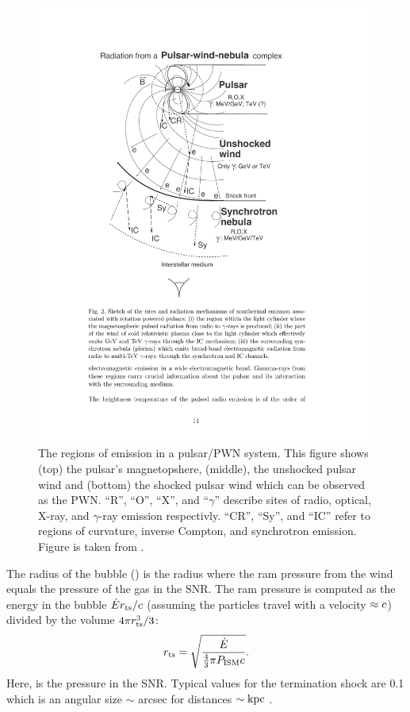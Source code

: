 \begin{figure}[htpb]
  \begin{center}
    \includegraphics{chapters/pulsar_pwn_system/figures/termination_shock.pdf}
  \end{center}
  \caption{The regions of emission in a pulsar/\ac{PWN} system. 
  This figure shows (top) the pulsar's magnetopshere, (middle), the
  unshocked pulsar wind and (bottom) the shocked pulsar wind which can
  be observed as the \ac{PWN}.
  ``R'', ``O'', ``X'', and ``$\gamma$'' describe sites of radio, optical, X-ray, and
  $\gamma$-ray emission respectivly.
  ``CR'', ``Sy'', and ``IC'' refer to regions of curvature, inverse Compton, and
  synchrotron emission.
  Figure is taken from \cite{aharonian_2003_exploring-physics}.
  }
\end{figure}

The radius of the bubble (\radiusterminationshock) is the
radius where the ram pressure from the wind equals the pressure of the
gas in the \ac{SNR}. 
The ram pressure is computed as the energy in the
bubble $\dot{E} r_\text{ts}/c$ (assuming the particles
travel with a velocity $\approx c$) divided by the volume
$4\pi r_\text{ts}^3/3$:
\begin{equation}
  r_\text{ts} = \sqrt{\frac{\dot{E}}{\tfrac{4}{3}\pi P_\text{ISM} c}}.
\end{equation}
Here, \pressureISM is the pressure in the SNR.
Typical values for the termination shock are 0.1\unitspace\parsec
which is an angular size $\sim$ \ac{arcsec} for distances $\sim\text{kpc}$
\citep{gaensler_2006_evolution-structure}.

